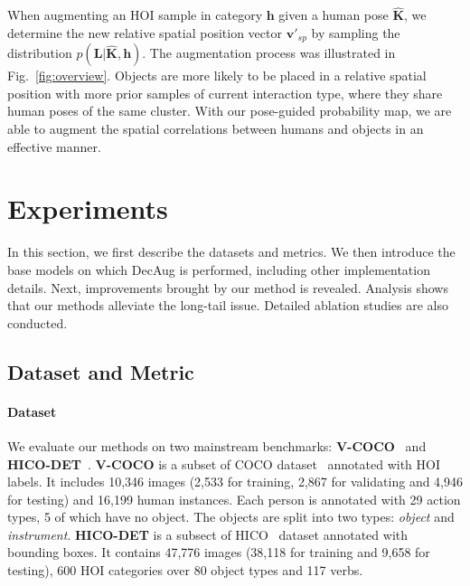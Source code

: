 \documentclass[10pt,twocolumn,letterpaper]{article}
\begin{document}
When augmenting an HOI sample in category $\mathbf{h}$ given a human pose $\hat{\mathbf{K}}$, we determine the new relative spatial position vector $\textbf{v}'_{sp}$ by sampling the distribution $p(\mathbf{L}|\hat{\mathbf{K}}, \mathbf{h})$. The augmentation process was illustrated in Fig.~\ref{fig:overview}. Objects are more likely to be placed in a relative spatial position with more prior samples of current interaction type, where they share human poses of the same cluster. With our pose-guided probability map, we are able to augment the spatial correlations between humans and objects in an effective manner.
\iffalse
\begin{figure}[tb!]
\centering

\subfigure{
\texttt{[image: fig/386872\_raw\_box.png]}
\texttt{[image: fig/386872\_heatmap\_ins.png]}
\texttt{[image: fig/386872\_boost\_box.png]}
}

\vfill

\subfigure{
\texttt{[image: fig/518957\_raw\_box.png]}
\texttt{[image: fig/518957\_heatmap\_ins.png]}
\texttt{[image: fig/518957\_boost\_box.png]}
}
\caption{The left are original images while the right are augmented ones. And middle images are the \textit{pose-guided probability map}. Objects are more likely to be placed in red regions than blue regions. For clarity, we temporarily disable the local object appearance augmentation.}
\label{fig:stochastic map}
\end{figure}
\fi

\section{Experiments}
In this section, we first describe the datasets and metrics. We then introduce the base models on which DecAug is performed, including other implementation details. Next, improvements brought by our method is revealed. Analysis shows that our methods alleviate the long-tail issue. Detailed ablation studies are also conducted.


\subsection{Dataset and Metric}
\paragraph{Dataset}
We evaluate our methods on two mainstream benchmarks: \textbf{V-COCO}~\cite{gupta2015visual} and \textbf{HICO-DET}~\cite{chao2018learning}. \textbf{V-COCO} is a subset of COCO dataset~\cite{lin2014microsoft} annotated with HOI labels. It includes 10,346 images (2,533 for training, 2,867 for validating and 4,946 for testing) and 16,199 human instances. Each person is annotated with 29 action types, 5 of which have no object. The objects are split into two types: \textit{object} and \textit{instrument}. \textbf{HICO-DET} is a subsect of HICO~\cite{chao2015hico} dataset annotated with bounding boxes. It contains 47,776 images (38,118 for training and 9,658 for testing), 600 HOI categories over 80 object types and 117 verbs.
\end{document}
